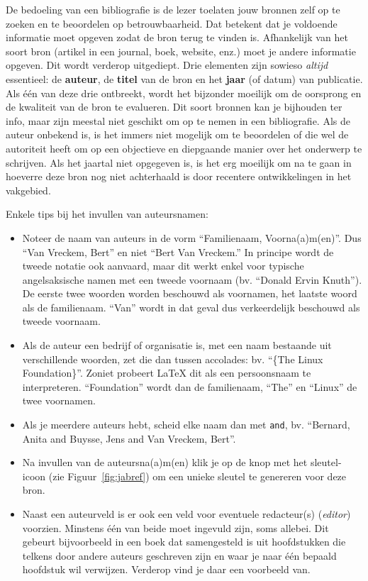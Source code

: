 De bedoeling van een bibliografie is de lezer toelaten jouw bronnen zelf op te zoeken en te beoordelen op betrouwbaarheid. Dat betekent dat je voldoende informatie moet opgeven zodat de bron terug te vinden is. Afhankelijk van het soort bron (artikel in een journal, boek, website, enz.) moet je andere informatie opgeven. Dit wordt verderop uitgediept. Drie elementen zijn sowieso \emph{altijd} essentieel: de \textbf{auteur}, de \textbf{titel} van de bron en het \textbf{jaar} (of datum) van publicatie. Als één van deze drie ontbreekt, wordt het bijzonder moeilijk om de oorsprong en de kwaliteit van de bron te evalueren. Dit soort bronnen kan je bijhouden ter info, maar zijn meestal niet geschikt om op te nemen in een bibliografie. Als de auteur onbekend is, is het immers niet mogelijk om te beoordelen of die wel de autoriteit heeft om op een objectieve en diepgaande manier over het onderwerp te schrijven. Als het jaartal niet opgegeven is, is het erg moeilijk om na te gaan in hoeverre deze bron nog niet achterhaald is door recentere ontwikkelingen in het vakgebied.

Enkele tips bij het invullen van auteursnamen:

\begin{itemize}
  \item Noteer de naam van auteurs in de vorm ``Familienaam, Voorna(a)m(en)''. Dus ``Van Vreckem, Bert'' en niet ``Bert Van Vreckem.'' In principe wordt de tweede notatie ook aanvaard, maar dit werkt enkel voor typische angelsaksische namen met een tweede voornaam (bv. ``Donald Ervin Knuth''). De eerste twee woorden worden beschouwd als voornamen, het laatste woord als de familienaam. ``Van'' wordt in dat geval dus verkeerdelijk beschouwd als tweede voornaam.
  \item Als de auteur een bedrijf of organisatie is, met een naam bestaande uit verschillende woorden, zet die dan tussen accolades: bv. ``\{The Linux Foundation\}''. Zoniet probeert {\LaTeX} dit als een persoonsnaam te interpreteren. ``Foundation'' wordt dan de familienaam, ``The'' en ``Linux'' de twee voornamen.
  \item Als je meerdere auteurs hebt, scheid elke naam dan met \texttt{and}, bv. ``Bernard, Anita and Buysse, Jens and Van Vreckem, Bert''.
  \item Na invullen van de auteursna(a)m(en) klik je op de knop met het sleutel-icoon (zie Figuur~\ref{fig:jabref}) om een unieke sleutel te genereren voor deze bron.
  \item Naast een auteurveld is er ook een veld voor eventuele redacteur(s) (\emph{editor}) voorzien. Minstens één van beide moet ingevuld zijn, soms allebei. Dit gebeurt bijvoorbeeld in een boek dat samengesteld is uit hoofdstukken die telkens door andere auteurs geschreven zijn en waar je naar één bepaald hoofdstuk wil verwijzen. Verderop vind je daar een voorbeeld van.
\end{itemize}

